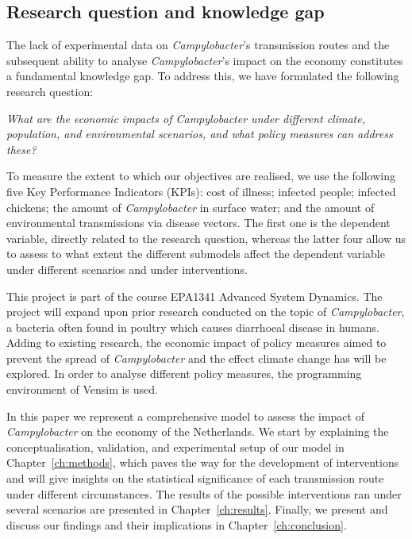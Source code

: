 \subsection*{Research question and knowledge gap}


The lack of experimental data on \textit{Campylobacter}’s transmission routes and the subsequent ability to analyse \textit{Campylobacter}’s impact on the economy constitutes a fundamental knowledge gap. To address this, we have formulated the following research question:
\begin{center}\textit{\textcolor{NiceBlue}{
What are the economic impacts of Campylobacter under different climate, population, and environmental scenarios, and what policy measures can address these? 
}}
\end{center}
To measure the extent to which our objectives are realised, we use the following five Key Performance Indicators (KPIs): cost of illness; infected people; infected chickens; the amount of \textit{Campylobacter} in surface water; and the amount of environmental transmissions via disease vectors. The first one is the dependent variable, directly related to the research question, whereas the latter four allow us to assess to what extent the different submodels affect the dependent variable under different scenarios and under interventions.

This project is part of the course EPA1341 Advanced System Dynamics. The project will expand upon prior research conducted on the topic of \textit{Campylobacter}, a bacteria often found in poultry which causes diarrhoeal disease in humans. Adding to existing research, the economic impact of policy measures aimed to prevent the spread of  \textit{Campylobacter} and the effect climate change has will be explored. In order to analyse different policy measures, the programming environment of Vensim is used. 

In this paper we represent a comprehensive model to assess the impact of \textit{Campylobacter} on the economy of the Netherlands. We start by explaining the conceptualisation, validation, and experimental setup of our model in Chapter~\ref{ch:methods}, which paves the way for the development of interventions and will give insights on the statistical significance of each transmission route under different circumstances. The results of the possible interventions ran under several scenarios are presented in Chapter~\ref{ch:results}. Finally, we present and discuss our findings and their implications in Chapter~\ref{ch:conclusion}.

